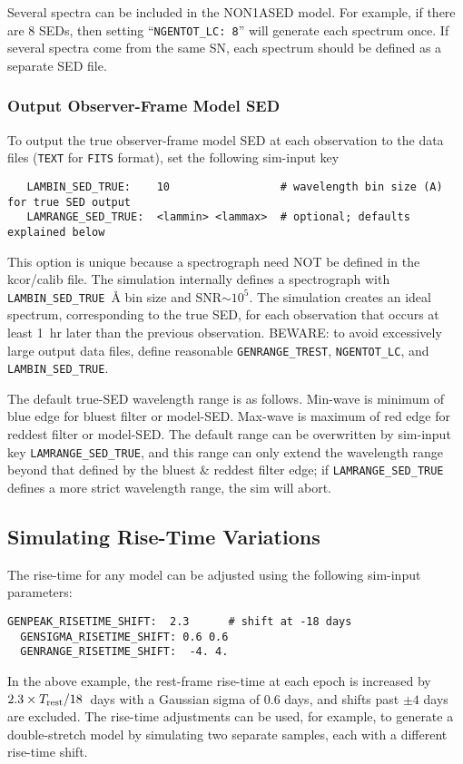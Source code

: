 \documentclass[12pt]{article}
\newcommand{\Trest}{T_{\rm rest}}
\begin{document}
Several spectra can be included in the NON1ASED model.
For example, if there are 8 SEDs, then setting 
``{\tt NGENTOT\_LC: 8}'' will generate each spectrum once.
If several spectra come from the same SN,
each spectrum should be defined as a separate SED file.


\subsubsection{Output Observer-Frame Model SED}
\label{sss:modelSED}

To output the true observer-frame model SED at each observation
to the data files ({\tt TEXT} for {\tt FITS} format),
set the following sim-input key
 \begin{verbatim}
   LAMBIN_SED_TRUE:    10                 # wavelength bin size (A) for true SED output
   LAMRANGE_SED_TRUE:  <lammin> <lammax>  # optional; defaults explained below
\end{verbatim}
%
This option is unique because
a spectrograph need NOT be defined in the kcor/calib file.
The simulation internally defines a spectrograph with 
{\tt LAMBIN\_SED\_TRUE}~{\AA} bin size and SNR${\sim}10^5$. 
The simulation creates an ideal spectrum,
corresponding to the true SED, for each observation
that occurs at least 1~hr later than the previous observation.
BEWARE: to avoid excessively large output data files,
define reasonable {\tt GENRANGE\_TREST}, {\tt NGENTOT\_LC},
and {\tt LAMBIN\_SED\_TRUE}.

The default true-SED wavelength range is as follows. Min-wave is minimum
of blue edge for bluest filter or model-SED. 
Max-wave is maximum of red edge for reddest filter or model-SED.
The default range can be overwritten by sim-input key {\tt LAMRANGE\_SED\_TRUE},
and this range can only extend the wavelength range beyond that defined
by the bluest \& reddest filter edge; if {\tt LAMRANGE\_SED\_TRUE}
defines a more strict wavelength range, the sim will abort.



\subsection{Simulating Rise-Time Variations}
\label{subsec:simRiseTime}

The rise-time for any model can be adjusted using 
the following sim-input parameters:
\begin{Verbatim}[frame=single]
  GENPEAK_RISETIME_SHIFT:  2.3      # shift at -18 days
  GENSIGMA_RISETIME_SHIFT: 0.6 0.6
  GENRANGE_RISETIME_SHIFT:  -4. 4.
\end{Verbatim}
%
In the above example, the rest-frame rise-time at each epoch
is increased by $2.3\times \Trest/18$~days
with a Gaussian sigma of 0.6 days,
and shifts past $\pm 4$ days are excluded.
The rise-time adjustments can be used, for example, 
to generate a double-stretch model by simulating 
two separate samples, each with a different 
rise-time shift.
\end{document}
